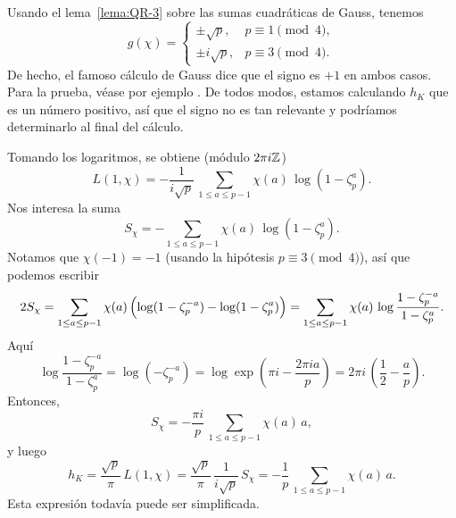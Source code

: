 Usando el lema~\ref{lema:QR-3} sobre las sumas cuadráticas de Gauss, tenemos
\[ g (\chi) = \begin{cases}
  \pm\sqrt{p}, & p \equiv 1 \pmod{4},\\
  \pm i\sqrt{p}, & p \equiv 3 \pmod{4}.
\end{cases} \]
De hecho, el famoso cálculo de Gauss dice que el signo es $+1$ en ambos
casos. Para la prueba, véase por ejemplo \cite[Chapter~6]{Ireland-Rosen}.
De todos modos, estamos calculando $h_K$ que es un número positivo, así que
el signo no es tan relevante y podríamos determinarlo al final del cálculo.

Tomando los logaritmos, se obtiene (módulo $2\pi i\mathbb{Z}$)
$$L(1,\chi) = -\frac{1}{i\sqrt{p}}\,\sum_{1 \le a \le p-1} \chi (a)\,\log (1 - \zeta_p^a).$$
Nos interesa la suma
$$S_\chi = -\sum_{1 \le a \le p-1} \chi (a)\,\log (1 - \zeta_p^a).$$
Notamos que $\chi (-1) = -1$ (usando la hipótesis $p \equiv 3 \pmod{4}$),
así que podemos escribir
\[ 2 S_\chi = \sum_{1 \le a \le p-1} \chi (a)\,\Bigl(\log (1 - \zeta_p^{-a}) - \log (1 - \zeta_p^a)\Bigr) =
   \sum_{1 \le a \le p-1} \chi (a)\,\log \frac{1 - \zeta_p^{-a}}{1 - \zeta_p^a}. \]
Aquí
\[ \log \frac{1 - \zeta_p^{-a}}{1 - \zeta_p^a} =
   \log (-\zeta_p^{-a}) =
   \log \exp \left(\pi i - \frac{2\pi i a}{p}\right) =
   2\pi i\,\left(\frac{1}{2} - \frac{a}{p}\right). \]
Entonces,
$$S_\chi = -\frac{\pi i}{p}\,\sum_{1 \le a \le p-1} \chi (a)\,a,$$
y luego
\[ h_K = \frac{\sqrt{p}}{\pi}\,L(1,\chi) =
   \frac{\sqrt{p}}{\pi}\,\frac{1}{i\sqrt{p}}\,S_\chi =
   -\frac{1}{p}\,\sum_{1 \le a \le p-1} \chi (a)\,a. \]
Esta expresión todavía puede ser simplificada.

